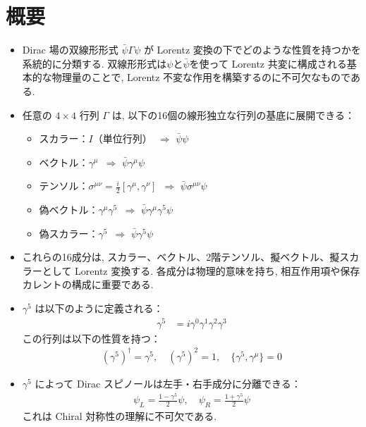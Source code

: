 \documentclass[a4paper,12pt]{article}
\begin{document}
\section*{概要}
\begin{itemize}
  \item Dirac 場の双線形形式 $\bar{\psi} \Gamma \psi$ が Lorentz 変換の下でどのような性質を持つかを系統的に分類する. 双線形形式は$\psi$と$\bar{\psi}$を使って Lorentz 共変に構成される基本的な物理量のことで, Lorentz 不変な作用を構築するのに不可欠なものである.

  \item 任意の $4 \times 4$ 行列 $\Gamma$ は, 以下の16個の線形独立な行列の基底に展開できる：
  \begin{itemize}
    \item スカラー：$I$（単位行列） $\,\Rightarrow$ $\bar{\psi} \psi$
    \item ベクトル：$\gamma^\mu$ $\,\Rightarrow$ $\bar{\psi} \gamma^\mu \psi$
    \item テンソル：$\sigma^{\mu\nu} = \frac{i}{2} [\gamma^\mu, \gamma^\nu]$ $\,\Rightarrow$ $\bar{\psi} \sigma^{\mu\nu} \psi$
    \item 偽ベクトル：$\gamma^\mu \gamma^5$ $\,\Rightarrow$ $\bar{\psi} \gamma^\mu \gamma^5 \psi$
    \item 偽スカラー：$\gamma^5$ $\,\Rightarrow$ $\bar{\psi} \gamma^5 \psi$
  \end{itemize}

  \item これらの16成分は, スカラー、ベクトル、2階テンソル、擬ベクトル、擬スカラーとして Lorentz 変換する.
  各成分は物理的意味を持ち, 相互作用項や保存カレントの構成に重要である.

  \item $\gamma^5$ は以下のように定義される：
  \begin{align*}
    \gamma^5 &= i \gamma^0 \gamma^1 \gamma^2 \gamma^3
  \end{align*}
  この行列は以下の性質を持つ：
  \begin{align*}
    (\gamma^5)^\dagger = \gamma^5,\quad (\gamma^5)^2 = 1,\quad \{ \gamma^5, \gamma^\mu \} = 0
  \end{align*}

  \item $\gamma^5$ によって Dirac スピノールは左手・右手成分に分離できる：
  \begin{align*}
    \psi_L = \frac{1 - \gamma^5}{2} \psi,\quad \psi_R = \frac{1 + \gamma^5}{2} \psi
  \end{align*}
  これは Chiral 対称性の理解に不可欠である.


\end{itemize}
\end{document}
